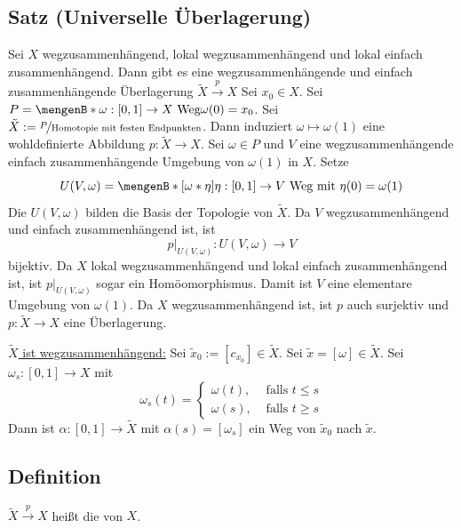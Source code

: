 \subsection{Satz (Universelle Überlagerung)} %
\label{sub:133}
Sei $X$ wegzusammenhängend, lokal wegzusammenhängend und lokal einfach zusammenhängend. Dann gibt es eine wegzusammenhängende und einfach zusammenhängende  Überlagerung 
$\tilde{X} \xrightarrow{p} X $
Sei $x_0 \in X$. Sei $P = \set[{\omega : [0,1] \to X \text{ Weg}}]{\omega(0)=x_0} $. Sei $\tilde{X}:= \nicefrac{P}{\text{Homotopie mit festen Endpunkten}}$. Dann induziert
$\omega \mapsto \omega(1)$ eine wohldefinierte Abbildung $p : \tilde{X} \to X$. Sei $\omega \in P$ und $V$ eine wegzusammenhängende einfach zusammenhängende Umgebung
von $\omega(1)$ in $X$. Setze 
\[
	U(V,\omega) = \set[{[\omega * \eta]}]{\rule{0cm}{1em} \eta : [0,1] \to V \text{ Weg mit } \eta(0)= \omega(1)} 
\]
Die $U(V,\omega)$ bilden die Basis der Topologie von $\tilde{X}$. Da $V$ wegzusammenhängend und einfach zusammenhängend ist, ist 
\[
	p \Big|_{U(V,\omega)} : U(V,\omega) \to V
\]
bijektiv. Da $X$ lokal wegzusammenhängend und lokal einfach zusammenhängend ist, ist $p \big|_{U(V,\omega)}$ sogar ein Homöomorphismus. Damit ist $V$ eine elementare 
Umgebung von $\omega(1)$. Da $X$ wegzusammenhängend ist, ist $p$ auch surjektiv und $p : \tilde{X} \to X$ eine Überlagerung.

\uline{$\tilde{X}$ ist wegzusammenhängend:} Sei $\tilde{x}_0 := [c_{x_0}] \in \tilde{X}$. Sei $\tilde{x} = [\omega] \in \tilde{X}$. Sei $\omega_s : [0,1] \to X$ mit
\[
	\omega_s(t) = \begin{cases}
		\omega(t), &\text{ falls }t \le s\\
		\omega(s), &\text{ falls } t  \ge s
	\end{cases}
\]
Dann ist $\alpha : [0,1] \to \tilde{X}$ mit $\alpha(s) = [\omega_s]$ ein Weg von $\tilde{x}_0$ nach $\tilde{x}$.

\subsection[Definition; Universelle Überlagerung]{Definition} %
\label{sub:134}
$\tilde{X} \xrightarrow{p} X $ heißt die  von $X$.

